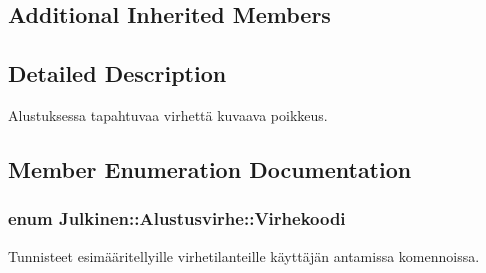 \subsection*{Additional Inherited Members}


\subsection{Detailed Description}
Alustuksessa tapahtuvaa virhettä kuvaava poikkeus. 

\subsection{Member Enumeration Documentation}
\hypertarget{class_julkinen_1_1_alustusvirhe_a6c27ff51ee369cf37028b8a7ea0eafc0}{}
\subsubsection[{Virhekoodi}]{\setlength{\rightskip}{0pt plus 5cm}enum {\bf Julkinen\+::\+Alustusvirhe\+::\+Virhekoodi}}\label{class_julkinen_1_1_alustusvirhe_a6c27ff51ee369cf37028b8a7ea0eafc0}


Tunnisteet esimääritellyille virhetilanteille käyttäjän antamissa komennoissa. 

